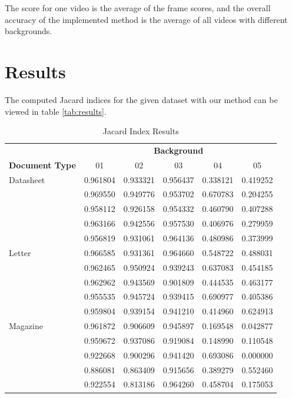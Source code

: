 \documentclass[english, paper=a4]{scrartcl}
\begin{document}
The score for one video is the average of the frame scores, and the overall accuracy of the implemented method is the average of all videos with different backgrounds.

\section{Results}

The computed Jacard indices for the given dataset with our method can be viewed in 
table \ref{tab:results}.

\begin{table}[]
\centering
\caption{Jacard Index Results}
\label{tax}
\begin{tabular}{l | p{2cm}| p{2cm}| p{2cm}| p{2cm}| p{2cm} }
\hline
& \multicolumn{5}{|c}{\textbf{Background}} \\
\textbf{Document Type} &  \multicolumn{1}{c}{01} & \multicolumn{1}{c}{02} & \multicolumn{1}{c}{03} & \multicolumn{1}{c}{04} &\multicolumn{1}{c}{05} \\ \hline\hline
Datasheet & 0.961804   & 0.933321  &0.956437 &0.338121 &0.419252  \\ 
           &0.969550 & 0.949776  &0.953702 &0.670783 &0.204255  \\ 
           & 0.958112  & 0.926158  &0.954332 &0.460790 &0.407288  \\ 
           & 0.963166  & 0.942556  &0.957530 &0.406976 &0.279959  \\ 
           & 0.956819  & 0.931061  &0.964136 &0.480986 &0.373999  \\ \hline
Letter & 0.966585 & 0.931361  &0.964660 &0.548722 &0.488031  \\    
		& 0.962465 & 0.950924  &0.939243 &0.637083 &0.454185  \\ 
		& 0.962962 & 0.943569  &0.901809 &0.444535 &0.463177  \\ 
		& 0.955535 & 0.945724  &0.939415 &0.690977 &0.405386  \\ 
		& 0.959804 & 0.939154  &0.941210 &0.414960 &0.624913  \\ \hline 
Magazine & 0.961872 & 0.906609  &0.945897 &0.169548 &0.042877  \\   
		& 0.959672 & 0.937086  &0.919084 &0.148990 &0.110548  \\ 
		& 0.922668 & 0.900296  &0.941420 &0.693086 &0.000000  \\ 
		& 0.886081 & 0.863409  &0.915656 &0.389279 &0.552460  \\ 
		& 0.922554 & 0.813186  &0.964260 &0.458704 &0.175053  \\ \hline 	

\end{tabular}
\end{table}
\end{document}
